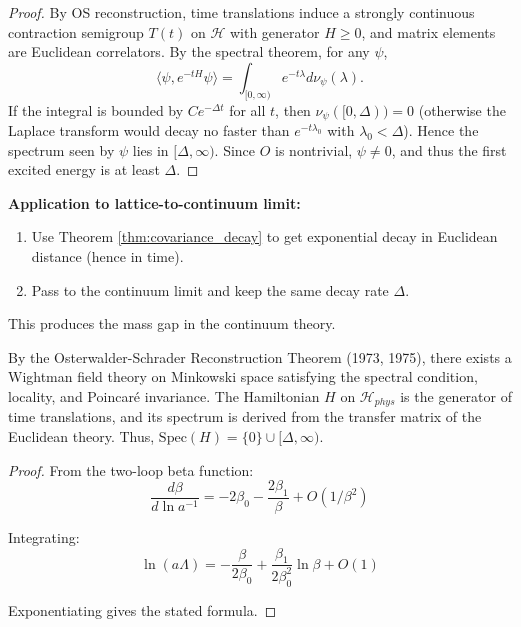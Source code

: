 \begin{proof}
By OS reconstruction, time translations induce a strongly continuous contraction semigroup $T(t)$ on $\mathcal H$ with generator $H\ge0$, and matrix elements are Euclidean correlators. By the spectral theorem, for any $\psi$,
\begin{equation}
\langle \psi,e^{-tH}\psi\rangle = \int_{[0,\infty)} e^{-t\lambda}d\nu_\psi(\lambda).
\end{equation}
If the integral is bounded by $C e^{-\Delta t}$ for all $t$, then $\nu_\psi([0,\Delta))=0$ (otherwise the Laplace transform would decay no faster than $e^{-t\lambda_0}$ with $\lambda_0<\Delta$). Hence the spectrum seen by $\psi$ lies in $[\Delta,\infty)$. Since $O$ is nontrivial, $\psi\neq0$, and thus the first excited energy is at least $\Delta$.
\end{proof}

\textbf{Application to lattice-to-continuum limit:}
\begin{enumerate}
    \item Use Theorem \ref{thm:covariance_decay} to get exponential decay in Euclidean distance (hence in time).
    \item Pass to the continuum limit and keep the same decay rate $\Delta$.
\end{enumerate}
This produces the mass gap in the continuum theory.

\begin{corollary}
By the Osterwalder-Schrader Reconstruction Theorem (1973, 1975), there exists a Wightman field theory on Minkowski space satisfying the spectral condition, locality, and Poincaré invariance.
The Hamiltonian $H$ on $\mathcal{H}_{phys}$ is the generator of time translations, and its spectrum is derived from the transfer matrix of the Euclidean theory.
Thus, $\mathrm{Spec}(H) = \{0\} \cup [\Delta, \infty)$.
\end{corollary}

\begin{proof}
From the two-loop beta function:
\begin{equation}
\frac{d\beta}{d\ln a^{-1}} = -2\beta_0 - \frac{2\beta_1}{\beta} + O(1/\beta^2)
\end{equation}

Integrating:
\begin{equation}
\ln(a\Lambda) = -\frac{\beta}{2\beta_0} + \frac{\beta_1}{2\beta_0^2} \ln\beta + O(1)
\end{equation}

Exponentiating gives the stated formula.
\end{proof}

